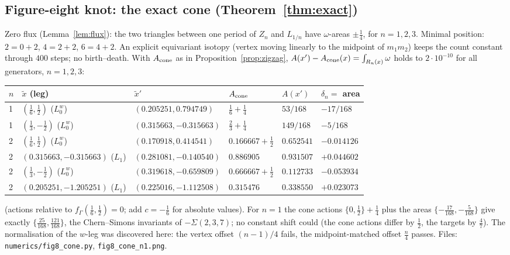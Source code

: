 \subsection{Figure-eight knot: the exact cone (Theorem~\ref{thm:exact})}
Zero flux (Lemma~\ref{lem:flux}): the two triangles between one period of $Z_n$ and $L_{1/n}$ have $\omega$-areas
$\pm\tfrac14$, for $n=1,2,3$.  Minimal position: $2=0+2$, $4=2+2$, $6=4+2$.  An explicit equivariant isotopy
(vertex moving linearly to the midpoint of $m_1m_2$) keeps the count constant through $400$ steps; no
birth--death.  With $A_{\rm cone}$ as in Proposition~\ref{prop:zigzag},
$A(x')-A_{\rm cone}(x)=\int_{R_n(x)}\omega$ holds to $2\cdot10^{-10}$ for all generators, $n=1,2,3$:
\begin{center}\small
\begin{tabular}{llllll}
\toprule
$n$ & $\tilde x$ (leg) & $\tilde x'$ & $A_{\rm cone}$ & $A(x')$ & $\delta_n=$ area\\
\midrule
1 & $(\tfrac16,\tfrac12)$ ($L^w_0$) & $(0.205251,0.794749)$ & $\tfrac16+\tfrac14$ & $53/168$ & $-17/168$\\
1 & $(\tfrac13,-\tfrac12)$ ($L^w_0$) & $(0.315663,-0.315663)$ & $\tfrac23+\tfrac14$ & $149/168$ & $-5/168$\\
2 & $(\tfrac16,\tfrac12)$ ($L^w_0$) & $(0.170918,0.414541)$ & $0.166667+\tfrac12$ & $0.652541$ & $-0.014126$\\
2 & $(0.315663,-0.315663)$ ($L_1$) & $(0.281081,-0.140540)$ & $0.886905$ & $0.931507$ & $+0.044602$\\
2 & $(\tfrac13,-\tfrac12)$ ($L^w_0$) & $(0.319618,-0.659809)$ & $0.666667+\tfrac12$ & $0.112733$ & $-0.053934$\\
2 & $(0.205251,-1.205251)$ ($L_1$) & $(0.225016,-1.112508)$ & $0.315476$ & $0.338550$ & $+0.023073$\\
\bottomrule
\end{tabular}
\end{center}
(actions relative to $f_\Gamma(\tfrac16,\tfrac12)=0$; add $c=-\tfrac16$ for absolute values).  For $n=1$ the cone
actions $\{0,\tfrac12\}+\tfrac14$ plus the areas $\{-\tfrac{17}{168},-\tfrac5{168}\}$ give exactly
$\{\tfrac{25}{168},\tfrac{121}{168}\}$, the Chern--Simons invariants of $-\Sigma(2,3,7)$; no constant shift could
(the cone actions differ by $\tfrac12$, the targets by $\tfrac47$).  The normalisation of the $w$-leg was
discovered here: the vertex offset $(n-1)/4$ fails, the midpoint-matched offset $\tfrac n4$ passes.
Files: \texttt{numerics/fig8\_cone.py}, \texttt{fig8\_cone\_n1.png}.

